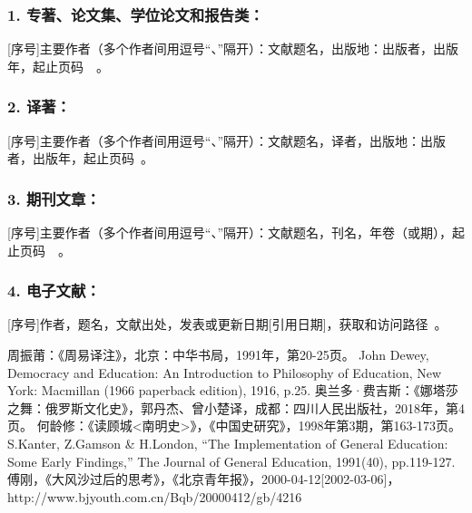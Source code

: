 \documentclass[UTF8,AutoFakeBold]{ctexbook}
\begin{document}
\subsubsection*{1. 专著、论文集、学位论文和报告类：}
[序号]主要作者（多个作者间用逗号“、”隔开）：文献题名，出版地：出版者，出版年，起止页码~\cite{ref1}~\cite{ref2}。 

\subsubsection*{2. 译著：}
[序号]主要作者（多个作者间用逗号“、”隔开）：文献题名，译者，出版地：出版者，出版年，起止页码~\cite{ref3}。

\subsubsection*{3. 期刊文章：}
[序号]主要作者（多个作者间用逗号“、”隔开）：文献题名，刊名，年卷（或期），起止页码~\cite{ref4}~\cite{ref5}。 

\subsubsection*{4. 电子文献：}
[序号]作者，题名，文献出处，发表或更新日期[引用日期]，获取和访问路径~\cite{ref6}。 


\let\cleardoublepage\clearpage

\begin{thebibliography}{99}
 周振莆：《周易译注》，北京：中华书局，1991年，第20-25页。
 John Dewey, Democracy and Education: An Introduction to Philosophy of Education, New York: Macmillan (1966 paperback edition), 1916, p.25.
 奥兰多·费吉斯：《娜塔莎之舞：俄罗斯文化史》，郭丹杰、曾小楚译，成都：四川人民出版社，2018年，第4页。
 何龄修：《读顾城<南明史>》，《中国史研究》，1998年第3期，第163-173页。
 S.Kanter, Z.Gamson \& H.London, “The Implementation of General Education: Some Early Findings,” The Journal of General Education, 1991(40), pp.119-127.
 傅刚，《大风沙过后的思考》，《北京青年报》，2000-04-12[2002-03-06]，http://www.bjyouth.com.cn/Bqb/20000412/gb/4216%
\end{thebibliography}
\end{document}

